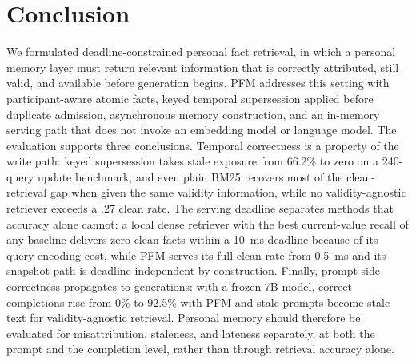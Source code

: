 \documentclass[letterpaper]{article} %
\begin{document}
\section{Conclusion}

We formulated deadline-constrained personal fact retrieval, in which a personal memory layer must return relevant information that is correctly attributed, still valid, and available before generation begins. PFM addresses this setting with participant-aware atomic facts, keyed temporal supersession applied before duplicate admission, asynchronous memory construction, and an in-memory serving path that does not invoke an embedding model or language model. The evaluation supports three conclusions. Temporal correctness is a property of the write path: keyed supersession takes stale exposure from 66.2\% to zero on a 240-query update benchmark, and even plain BM25 recovers most of the clean-retrieval gap when given the same validity information, while no validity-agnostic retriever exceeds a .27 clean rate. The serving deadline separates methods that accuracy alone cannot: a local dense retriever with the best current-value recall of any baseline delivers zero clean facts within a 10~ms deadline because of its query-encoding cost, while PFM serves its full clean rate from 0.5~ms and its snapshot path is deadline-independent by construction. Finally, prompt-side correctness propagates to generations: with a frozen 7B model, correct completions rise from 0\% to 92.5\% with PFM and stale prompts become stale text for validity-agnostic retrieval. Personal memory should therefore be evaluated for misattribution, staleness, and lateness separately, at both the prompt and the completion level, rather than through retrieval accuracy alone.


\end{document}

